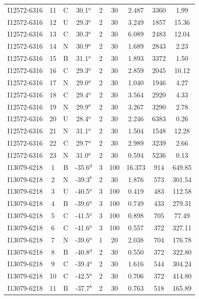 \begin{table}
\begin{tabular}{ccccccccc}
I12572-6316 & 11 & C & 30.1$^{a}$ & 2 & 30 & 2.487 & 3360 & 1.99 \\
I12572-6316 & 12 & U & 29.3$^{a}$ & 2 & 30 & 3.249 & 1857 & 15.36 \\
I12572-6316 & 13 & C & 30.3$^{a}$ & 2 & 30 & 6.089 & 2483 & 12.04 \\
I12572-6316 & 14 & N & 30.9$^{a}$ & 2 & 30 & 1.689 & 2843 & 2.23 \\
I12572-6316 & 15 & B & 31.1$^{a}$ & 2 & 30 & 1.893 & 3372 & 1.50 \\
I12572-6316 & 16 & C & 29.3$^{a}$ & 2 & 30 & 2.859 & 2045 & 10.12 \\
I12572-6316 & 17 & N & 29.0$^{a}$ & 2 & 30 & 1.040 & 1946 & 4.27 \\
I12572-6316 & 18 & C & 29.4$^{a}$ & 2 & 30 & 3.564 & 2920 & 4.33 \\
I12572-6316 & 19 & N & 29.9$^{a}$ & 2 & 30 & 3.267 & 3290 & 2.78 \\
I12572-6316 & 20 & U & 28.4$^{a}$ & 2 & 30 & 2.246 & 6383 & 0.26 \\
I12572-6316 & 21 & N & 31.1$^{a}$ & 2 & 30 & 1.504 & 1548 & 12.28 \\
I12572-6316 & 22 & C & 29.7$^{a}$ & 2 & 30 & 2.989 & 3239 & 2.66 \\
I12572-6316 & 23 & N & 31.0$^{a}$ & 2 & 30 & 0.594 & 5236 & 0.13 \\
I13079-6218 & 1 & B & -35.6$^{d}$ & 3 & 100 & 16.373 & 914 & 649.85 \\
I13079-6218 & 2 & N & -39.3$^{b}$ & 2 & 30 & 1.876 & 573 & 301.54 \\
I13079-6218 & 3 & U & -40.5$^{a}$ & 3 & 100 & 0.419 & 483 & 112.58 \\
I13079-6218 & 4 & B & -39.6$^{a}$ & 3 & 100 & 0.749 & 433 & 279.31 \\
I13079-6218 & 5 & C & -41.5$^{a}$ & 3 & 100 & 0.898 & 705 & 77.49 \\
I13079-6218 & 6 & C & -41.6$^{a}$ & 3 & 100 & 0.557 & 372 & 327.11 \\
I13079-6218 & 7 & N & -39.6$^{a}$ & 1 & 20 & 2.038 & 704 & 176.78 \\
I13079-6218 & 8 & B & -40.8$^{d}$ & 2 & 30 & 0.550 & 372 & 322.80 \\
I13079-6218 & 9 & C & -39.4$^{a}$ & 2 & 30 & 1.616 & 544 & 304.24 \\
I13079-6218 & 10 & C & -42.5$^{a}$ & 2 & 30 & 0.706 & 372 & 414.80 \\
I13079-6218 & 11 & B & -37.7$^{b}$ & 2 & 30 & 0.763 & 518 & 165.89 \\

\end{tabular}
\end{table}
